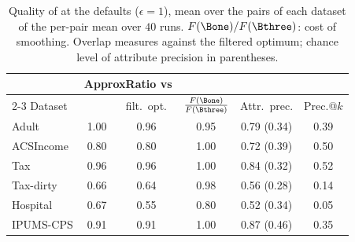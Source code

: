 \begin{table}[t]
\centering
\small
\caption{Quality of \sys{} at the defaults ($\epsilon=1$), mean over the pairs of each dataset of the per-pair mean over $40$ runs. $F(\Bone)/F(\Bthree)$: cost of smoothing. Overlap measures against the filtered optimum; chance level of attribute precision in parentheses.}
\label{tab:quality}
\setlength{\tabcolsep}{3.5pt}
\begin{tabular}{@{}lccccc@{}}
\toprule
 & \multicolumn{2}{c}{ApproxRatio vs} & & & \\
\cmidrule(lr){2-3}
Dataset & \Bone{} & filt.\ opt. & $\frac{F(\Bone)}{F(\Bthree)}$ & Attr.\ prec. & Prec.@$k$\\
\midrule
Adult      & 1.00 & 0.96 & 0.95 & 0.79 (0.34) & 0.39\\
ACSIncome  & 0.80 & 0.80 & 1.00 & 0.72 (0.39) & 0.50\\
Tax        & 0.96 & 0.96 & 1.00 & 0.84 (0.32) & 0.52\\
Tax-dirty  & 0.66 & 0.64 & 0.98 & 0.56 (0.28) & 0.14\\
Hospital   & 0.67 & 0.55 & 0.80 & 0.52 (0.34) & 0.05\\
IPUMS-CPS  & 0.91 & 0.91 & 1.00 & 0.87 (0.46) & 0.35\\
\bottomrule
\end{tabular}
\end{table}

